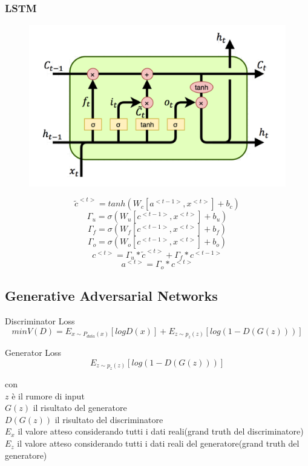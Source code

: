 \documentclass[]{article}
\begin{document}
\subsubsection{LSTM}
\begin{figure}[h] 
\centering 
\includegraphics[scale=0.42]{lstm} 
\end{figure} 
\[ \tilde{c}^{<t>} = tanh(W_c[{a}^{<t-1>}, {x}^{<t>}] +b_c) \]
\[ \Gamma_u   = \sigma(W_u[{c}^{<t-1>}, {x}^{<t>}] + b_u) \]
\[ \Gamma_f   = \sigma(W_f[{c}^{<t-1>}, {x}^{<t>}] + b_f) \]
\[ \Gamma_o   = \sigma(W_o[{c}^{<t-1>}, {x}^{<t>}] + b_o) \]
\[ c^{<t>} = \Gamma_u * \tilde{c}^{<t>} + \Gamma_f*c^{<t-1>} \]
\[a^{<t>} = \Gamma_o * c^{<t>} \]


\subsection{Generative Adversarial Networks}
Discriminator Loss\\
\[ minV(D) = E_{x\sim P_{data}(x)}[logD(x)] + E_{z\sim p_{z} (z)} [log(1-D(G(z)))] \]

Generator Loss\\
\[ E_{z\sim p_{z} (z)} [log(1-D(G(z)))] \]

con\\
$z$ è il rumore di input \\
$G(z)$ il risultato del generatore\\
$D(G(z))$ il risultato del discriminatore\\
$E_x$ il valore atteso considerando tutti i dati reali(grand truth del discriminatore)\\
$E_z$  il valore atteso considerando tutti i dati reali del generatore(grand truth del generatore)\\\\
\end{document}
